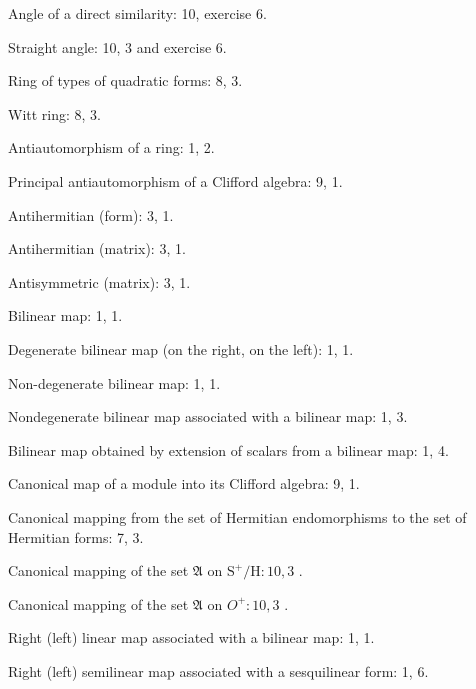 Angle of a direct similarity: 10, exercise 6.

Straight angle: 10, 3 and exercise 6.

Ring of types of quadratic forms: 8, 3.

Witt ring: 8, 3.

Antiautomorphism of a ring: 1, 2.

Principal antiautomorphism of a Clifford algebra: 9, 1.

Antihermitian (form): 3, 1.

Antihermitian (matrix): 3, 1.

Antisymmetric (matrix): 3, 1.

Bilinear map: 1, 1.

Degenerate bilinear map (on the right, on the left): 1, 1.

Non-degenerate bilinear map: 1, 1.

Nondegenerate bilinear map associated with a bilinear map: 1, 3.

Bilinear map obtained by extension of scalars from a bilinear map: 1, 4.

Canonical map of a module into its Clifford algebra: 9, 1.

Canonical mapping from the set of Hermitian endomorphisms to the set of Hermitian forms: 7, 3.

Canonical mapping of the set \(\mathfrak{A}\) on \(\mathrm{S}^{+}/\mathrm{H}:10,3\) .

Canonical mapping of the set \(\mathfrak{A}\) on \(O^{+}:10,3\) .

Right (left) linear map associated with a bilinear map: 1, 1.

Right (left) semilinear map associated with a sesquilinear form: 1, 6.

